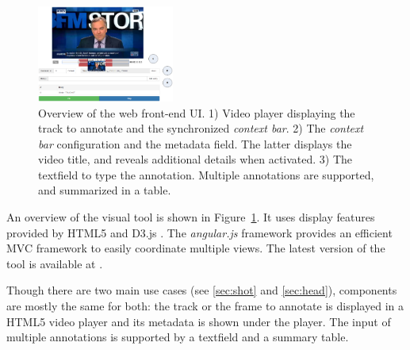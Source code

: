 \documentclass[a4paper]{article}
\begin{document}
\begin{figure}[h]
	\centering
 	\includegraphics[width=0.4\textwidth]{camomile_ui-bis.png}
	\caption{Overview of the web front-end UI. 1) Video player displaying the track to annotate and the synchronized \emph{context bar}. 2) The \emph{context bar} configuration and the metadata field. The latter displays the video title, and reveals additional details when activated. 3) The textfield to type the annotation. Multiple annotations are supported, and summarized in a table.}
	\label{fig:frontend}

\end{figure}


An overview of the visual tool is shown in Figure~\ref{fig:frontend}. It uses display features provided by HTML5 and D3.js \cite{d3js}. The \textit{angular.js} framework \cite{angularjs} provides an efficient MVC framework to easily coordinate multiple views. The latest version of the tool is available at \cite{urlgithub}.



Though there are two main use cases (see \ref{sec:shot} and \ref{sec:head}), components are mostly the same for both: the track or the frame to annotate is displayed in a HTML5 video player and its metadata is shown under the player. The input of multiple annotations is supported by a textfield and a summary table. 



\end{document}
